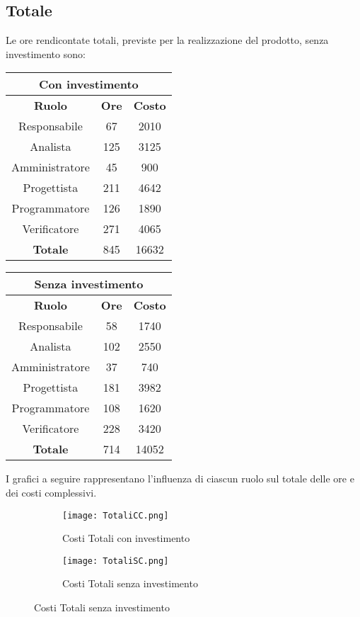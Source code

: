 \documentclass{scalatekids-article}
\begin{document}
\subsection{Totale}
Le ore rendicontate totali, previste per la realizzazione del prodotto, senza
investimento sono:
\begin{center}
  \normalsize
  \begin{tabular}{| c | c | c |}
    \hline
    \multicolumn{3}{|c|}{\textbf{Con investimento}}\\
    \hline
    \textbf{Ruolo} & \textbf{Ore} & \textbf{Costo}\\
    \hline
    Responsabile & 67 & 2010 \\
    Analista & 125 & 3125\\
    Amministratore & 45 & 900\\
    Progettista & 211 & 4642\\
    Programmatore & 126 & 1890\\
    Verificatore & 271 & 4065\\
    \hline
    \textbf{Totale} & 845 & 16632\\
    \hline
  \end{tabular}
  \qquad
  \begin{tabular}{| c | c | c |}
    \hline
    \multicolumn{3}{|c|}{\textbf{Senza investimento}}\\
    \hline
    \textbf{Ruolo} & \textbf{Ore} & \textbf{Costo}\\
    \hline
    Responsabile & 58 & 1740\\
    Analista & 102 & 2550\\
    Amministratore & 37 & 740\\
    Progettista & 181 & 3982\\
    Programmatore & 108 & 1620\\
    Verificatore & 228 & 3420\\
    \hline
    \textbf{Totale} & 714 & 14052 \\
    \hline
  \end{tabular}
\end{center}
I grafici a seguire rappresentano l'influenza di ciascun ruolo sul totale delle ore e dei costi complessivi.
\begin{figure}[H]
  \begin{subfigure}[H]{0.47\textwidth}
    \texttt{[image: TotaliCC.png]}
    \caption{Costi Totali con investimento}
  \end{subfigure}
  \qquad
  \begin{subfigure}[H]{0.47\textwidth}
    \texttt{[image: TotaliSC.png]}
    \caption{Costi Totali senza investimento}
  \end{subfigure}
\end{figure}
\end{document}
